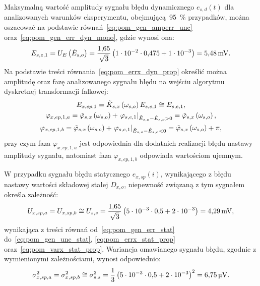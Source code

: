 Maksymalną wartość amplitudy sygnału błędu dynamicznego $e_{s,d}(t)$ dla analizowanych warunków eksperymentu, obejmującą~\qty{95}{\percent} przypadków, można oszacować na podstawie równań~\eqref{eq:pom_gen_amperr_unc} oraz~\eqref{eq:pom_gen_err_dyn_mono}, gdzie wynosi ona:
\begin{equation}
E_{s,e,1} = U_{E} \left(\dot{E}_{s,o}\right) = \frac{\num{1.65}}{\sqrt{3}} \left(\num{1e-2} \cdot \num{0.475} + \num{1e-3}\right) = \qty{5.48}{mV} \label{eq:pom_mono_dyn_amp_in}.
\end{equation}
Na podstawie treści równania~\eqref{eq:pom_errx_dyn_prop} określić można amplitudę oraz fazę analizowanego sygnału błędu na wejściu algorytmu dyskretnej transformacji falkowej:
\begin{gather}
E_{x,ep,1} = \tilde{K}_{s,x} \left(\omega_{s,o}\right) E_{s,e,1} \cong E_{s,e,1} \label{eq:pom_mono_dyn_prop_amp_mid}, \\
\varphi_{x,ep,1,a} = \tilde{\varphi}_{s,x} \left(\omega_{s,o}\right) + \left. \varphi_{s,e,1} \right|_{\tilde{E}_{s,o} - \dot{E}_{s,o} > 0} = \tilde{\varphi}_{s,x} \left(\omega_{s,o}\right) \label{eq:pom_mono_dyn_prop_phi_mid_a}, \\
\varphi_{x,ep,1,b} = \tilde{\varphi}_{s,x} \left(\omega_{s,o}\right) + \left. \varphi_{s,e,1} \right|_{\tilde{E}_{s,o} - \dot{E}_{s,o} < 0} = \tilde{\varphi}_{s,x} \left(\omega_{s,o}\right) + \pi \label{eq:pom_mono_dyn_prop_phi_mid_b},
\end{gather}
przy czym faza $\varphi_{x,ep,1,a}$ jest odpowiednia dla dodatnich realizacji błędu nastawy amplitudy sygnału, natomiast faza $\varphi_{x,ep,1,b}$ odpowiada wartościom ujemnym.

W przypadku sygnału błędu statycznego $e_{x,sp}(i)$, wynikającego z błędu nastawy wartości składowej stałej $D_{x,o}$, niepewność związaną z tym sygnałem określa zależność:
\begin{equation}
U_{x,sp,a} = U_{x,sp,b} \cong U_{s,s} = \frac{\num{1.65}}{\sqrt{3}} \left(\num{5e-3} \cdot \num{0.5} + \num{2e-3}\right) = \qty{4.29}{mV} \label{eq:pom_mono_stat_unc_mid},
\end{equation}
wynikająca z treści równań od~\eqref{eq:pom_gen_err_stat} do~\eqref{eq:pom_gen_unc_stat}, \eqref{eq:pom_errx_stat_prop} oraz~\eqref{eq:pom_varx_stat_prop}. Wariancja omawianego sygnału błędu, zgodnie z wymienionymi zależnościami, wynosi odpowiednio:
\begin{equation}
\sigma_{x,sp,a}^{2} = \sigma_{x,sp,b}^{2} \cong \sigma_{s,s}^{2} = \frac{1}{3} \left(\num{5e-3} \cdot \num{0.5} + \num{2e-3}\right)^{2} = \qty{6.75}{\micro V} \label{eq:pom_mono_stat_var_mid}.
\end{equation}

